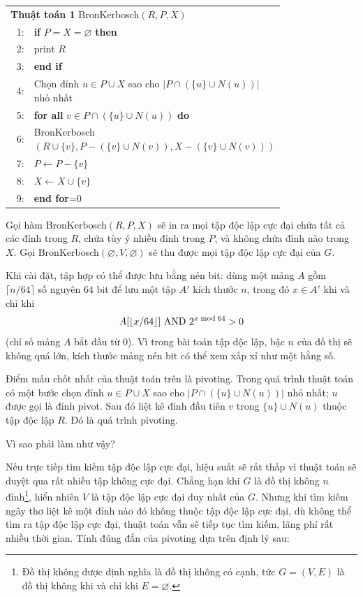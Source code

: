 \documentclass[11pt]{article}
\begin{document}
\begin{center}
\small
\begin{tabular}{r@{\quad}p{0.78\linewidth}}
\multicolumn{2}{l}{\textbf{Thuật toán 1} BronKerbosch\((R,P,X)\)}\\
1: & \textbf{if} \(P=X=\varnothing\) \textbf{then}\\
2: & \quad print \(R\)\\
3: & \textbf{end if}\\
4: & Chọn đỉnh \(u\in P\cup X\) sao cho
      \(|P\cap(\{u\}\cup N(u))|\) nhỏ nhất\\
5: & \textbf{for all} \(v\in P\cap(\{u\}\cup N(u))\) \textbf{do}\\
6: & \quad BronKerbosch\((R\cup\{v\},P-(\{v\}\cup N(v)),X-(\{v\}\cup N(v)))\)\\
7: & \quad \(P\gets P-\{v\}\)\\
8: & \quad \(X\gets X\cup\{v\}\)\\
9: & \textbf{end for}=0
\end{tabular}
\end{center}

Gọi hàm BronKerbosch\((R,P,X)\) sẽ in ra mọi tập độc lập cực đại chứa tất cả
các đỉnh trong \(R\), chứa tùy ý nhiều đỉnh trong \(P\), và không chứa đỉnh nào
trong \(X\). Gọi BronKerbosch\((\varnothing,V,\varnothing)\) sẽ thu được mọi
tập độc lập cực đại của \(G\).

Khi cài đặt, tập hợp có thể được lưu bằng nén bit: dùng một mảng \(A\) gồm
\(\lceil n/64\rceil\) số nguyên \(64\) bit để lưu một tập \(A'\) kích thước
\(n\), trong đó \(x\in A'\) khi và chỉ khi
\[
  A[\lfloor x/64\rfloor]\ {\rm AND}\ 2^{x\bmod 64}>0
\]
(chỉ số mảng \(A\) bắt đầu từ \(0\)). Vì trong bài toán tập độc lập, bậc \(n\)
của đồ thị sẽ không quá lớn, kích thước mảng nén bit có thể xem xấp xỉ như một
hằng số.

Điểm mấu chốt nhất của thuật toán trên là pivoting. Trong quá trình thuật toán
có một bước chọn đỉnh \(u\in P\cup X\) sao cho
\(|P\cap(\{u\}\cup N(u))|\) nhỏ nhất; \(u\) được gọi là đỉnh pivot. Sau đó liệt
kê đỉnh đầu tiên \(v\) trong \(\{u\}\cup N(u)\) thuộc tập độc lập \(R\). Đó là
quá trình pivoting.

Vì sao phải làm như vậy?

Nếu trực tiếp tìm kiếm tập độc lập cực đại, hiệu suất sẽ rất thấp vì thuật toán
sẽ duyệt qua rất nhiều tập không cực đại. Chẳng hạn khi \(G\) là đồ thị không
\(n\) đỉnh\footnote{Đồ thị không được định nghĩa là đồ thị không có cạnh, tức
\(G=(V,E)\) là đồ thị không khi và chỉ khi \(E=\varnothing\).}, hiển nhiên
\(V\) là tập độc lập cực đại duy nhất của \(G\). Nhưng khi tìm kiếm ngây thơ
liệt kê một đỉnh nào đó không thuộc tập độc lập cực đại, dù không thể tìm ra
tập độc lập cực đại, thuật toán vẫn sẽ tiếp tục tìm kiếm, lãng phí rất nhiều
thời gian. Tính đúng đắn của pivoting dựa trên định lý sau:
\end{document}
